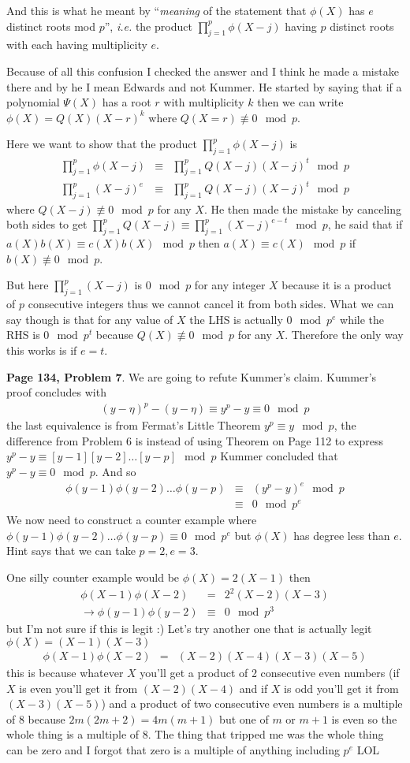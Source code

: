 \documentclass[aps,preprint,preprintnumbers,nofootinbib,showpacs,prd]{revtex4-1}
\newcommand{\ie}{{\it i.e.} }
\newcommand{\nbea}{\begin{eqnarray*}}
\newcommand{\neea}{\end{eqnarray*}}
\begin{document}
And this is what he meant by ``{\it meaning} of the statement that $\phi(X)$ has $e$ distinct roots mod $p$'', \ie the product $\prod_{j=1}^{p} \phi(X - j)$ having $p$ distinct roots with each having multiplicity $e$.

Because of all this confusion I checked the answer and I think he made a mistake there and by he I mean Edwards and not Kummer. He started by saying that if a polynomial $\Psi(X)$ has a root $r$ with multiplicity $k$ then we can write $\phi(X) = Q(X)(X - r)^k$ where $Q(X=r) \not\equiv 0 \mod p$.

Here we want to show that the product $\prod_{j=1}^{p} \phi(X - j)$ is
%
\nbea
\prod_{j=1}^{p} \phi(X - j) & \equiv & \prod_{j=1}^{p}Q(X - j)(X - j)^t \mod p \\
\prod_{j=1}^{p} (X - j)^e & \equiv & \prod_{j=1}^{p}Q(X - j)(X - j)^t \mod p 
\neea
%
where $Q(X - j) \not\equiv 0 \mod p$ for any $X$. He then made the mistake by canceling both sides to get $\prod_{j=1}^p Q(X - j) \equiv \prod_{j=1}^p (X - j)^{e - t} \mod p$, he said that if $a(X)b(X) \equiv c(X)b(X) \mod p$ then $a(X) \equiv c(X) \mod p$ if $b(X) \not\equiv 0 \mod p$.

But here $\prod_{j=1}^p (X - j)$ is $0 \mod p$ for any integer $X$ because it is a product of $p$ consecutive integers thus we cannot cancel it from both sides. What we can say though is that for any value of $X$ the LHS is actually $0 \mod p^e$ while the RHS is $0 \mod p^t$ because $Q(X) \not\equiv 0 \mod p$ for any $X$. Therefore the only way this works is if $e=t$.

{\bf Page 134, Problem 7}. We are going to refute Kummer's claim. Kummer's proof concludes with 
%
\nbea
(y - \eta)^p - (y - \eta) \equiv y^p - y \equiv 0 \mod{p}
\neea
%
the last equivalence is from Fermat's Little Theorem $y^p \equiv y \mod{p}$, the difference from Problem 6 is instead of using Theorem on Page 112 to express $y^p - y \equiv [y-1][y-2]\dots[y-p] \mod{p}$ Kummer concluded that $y^p - y \equiv 0 \mod{p}$. And so
%
\nbea
\phi(y-1)\phi(y-2)\dots\phi(y-p) & \equiv & (y^p - y)^e \mod{p} \\
& \equiv & 0 \mod{p^e}
\neea
%
We now need to construct a counter example where $\phi(y-1)\phi(y-2)\dots\phi(y-p) \equiv 0 \mod{p^e}$ but $\phi(X)$ has degree less than $e$. Hint says that we can take $p = 2, e = 3$.

One silly counter example would be $\phi(X) = 2(X - 1)$ then 
%
\nbea
\phi(X - 1)\phi(X - 2) & = & 2^2(X - 2)(X - 3) \\
\to \phi(y - 1) \phi(y - 2) & \equiv & 0 \mod{p^3}
\neea
%
but I'm not sure if this is legit :) Let's try another one that is actually legit $\phi(X) = (X - 1)(X - 3)$
%
\nbea
\phi(X - 1)\phi(X - 2) & = & (X-2)(X-4)(X - 3)(X - 5)
\neea
%
this is because whatever $X$ you'll get a product of 2 consecutive even numbers (if $X$ is even you'll get it from $(X-2)(X-4)$ and if $X$ is odd you'll get it from $(X - 3)(X - 5)$) and a product of two consecutive even numbers is a multiple of 8 because $2m(2m+2) = 4m(m+1)$ but one of $m$ or $m+1$ is even so the whole thing is a multiple of $8$. The thing that tripped me was the whole thing can be zero and I forgot that zero is a multiple of anything including $p^e$ LOL
\end{document}
